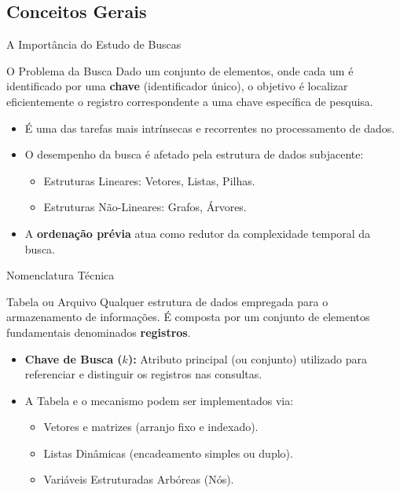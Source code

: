 \documentclass{beamer}
\begin{document}
\subsection{Conceitos Gerais}
\begin{frame}{A Importância do Estudo de Buscas}
\begin{block}{O Problema da Busca}
Dado um conjunto de elementos, onde cada um é identificado por uma \textbf{chave} (identificador único), o objetivo é localizar eficientemente o registro correspondente a uma chave específica de pesquisa.
\end{block}
\pause
\vspace{0.3cm}
\begin{itemize}
    \item É uma das tarefas mais intrínsecas e recorrentes no processamento de dados.
    \item O desempenho da busca é afetado pela estrutura de dados subjacente:
    \begin{itemize}
        \item Estruturas Lineares: Vetores, Listas, Pilhas.
        \item Estruturas Não-Lineares: Grafos, Árvores.
    \end{itemize}
    \item A \textbf{ordenação prévia} atua como redutor da complexidade temporal da busca.
\end{itemize}
\end{frame}

\begin{frame}{Nomenclatura Técnica}
\begin{block}{Tabela ou Arquivo}
Qualquer estrutura de dados empregada para o armazenamento de informações. É composta por um conjunto de elementos fundamentais denominados \textbf{registros}.
\end{block}
\pause
\vspace{0.4cm}
\begin{itemize}
    \item \textbf{Chave de Busca ($k$):} Atributo principal (ou conjunto) utilizado para referenciar e distinguir os registros nas consultas.
    \item A Tabela e o mecanismo podem ser implementados via:
    \begin{itemize}
        \item Vetores e matrizes (arranjo fixo e indexado).
        \item Listas Dinâmicas (encadeamento simples ou duplo).
        \item Variáveis Estruturadas Arbóreas (Nós).
    \end{itemize}
\end{itemize}
\end{frame}
\end{document}
